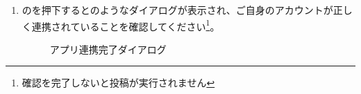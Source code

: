 \begin{enumerate}
                \newpage
                \item {}のを押下するとのようなダイアログが表示され、ご自身のアカウントが正しく連携されていることを確認してください\footnote{確認を完了しないと投稿が実行されません}。
                    \begin{figure}[htbp]
                        \centering
                        \caption{アプリ連携完了ダイアログ}
                        \label{img:misskey7}
                    \end{figure}
            \end{enumerate}

        \newpage
